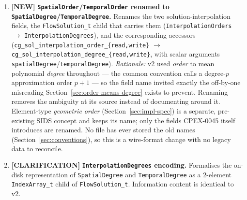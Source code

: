 \documentclass[11pt,letterpaper]{article}
\newcommand{\NEW}{\textcolor{newgreen}{\textbf{[NEW]}}}
\newcommand{\CLARIFY}{\textcolor{clarifybrown}{\textbf{[CLARIFICATION]}}}
\begin{document}
{\begin{enumerate}[nosep,leftmargin=1.5em]
  \item \NEW{} \textbf{\texttt{SpatialOrder}/\texttt{TemporalOrder} renamed to
    \texttt{SpatialDegree}/\texttt{TemporalDegree}.}
    Renames the two solution-interpolation fields, the \texttt{FlowSolution\_t} child
    that carries them (\texttt{InterpolationOrders} $\to$ \texttt{InterpolationDegrees}),
    and the corresponding accessors
    (\texttt{cg\_sol\_interpolation\_order\_\{read,write\}} $\to$
    \texttt{cg\_sol\_interpolation\_degree\_\{read,write\}}, with scalar arguments
    \texttt{spatialDegree}/\texttt{temporalDegree}).  \textit{Rationale:} v2 used \emph{order} to mean polynomial
    \emph{degree} throughout ---
    the common convention calls a degree-$p$ approximation order $p+1$ --- so the field name
    invited exactly the off-by-one misreading Section~\ref{sec:order-means-degree} exists to
    prevent.  Renaming removes the ambiguity at its source instead of documenting around it.
    Element-type \emph{geometric order} (Section~\ref{sec:impl-spec}) is a separate,
    pre-existing SIDS concept and keeps its name; only the fields CPEX-0045 itself introduces
    are renamed.  No file has ever stored the old names (Section~\ref{sec:conventions}), so
    this is a wire-format change with no legacy data to reconcile.

  \item \CLARIFY{} \textbf{\texttt{InterpolationDegrees} encoding.}
    Formalises the on-disk representation of \texttt{SpatialDegree} and
    \texttt{TemporalDegree} as a 2-element \texttt{IndexArray\_t} child of
    \texttt{FlowSolution\_t}.  Information content is identical to v2.


\end{enumerate}}
\end{document}
